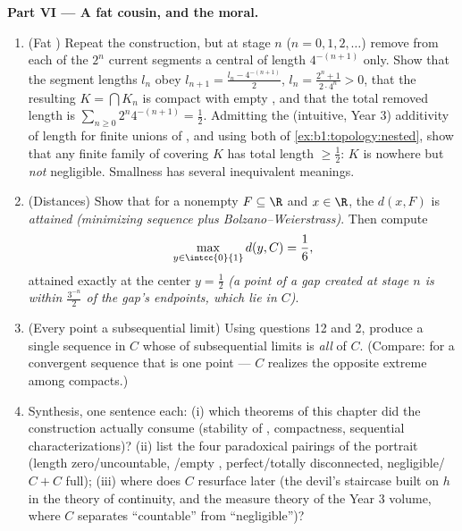 \begin{problem}[{Weekend problem --- the Cantor middle-thirds
\omterm{def:b1:logic:sets}{set}: length zero, uncountable, perfect, and $C + C =
\intcc{0}{2}$}]
\medskip
\noindent\textbf{Part VI --- A fat cousin, and the moral.}
\begin{enumerate}[resume]
  \item (Fat ) Repeat the construction, but at stage
        $n$ ($n = 0, 1, 2, \dots$) remove from each of the $2^n$
        current segments a central   of length
        $4^{-(n+1)}$ only. Show that the segment lengths $l_n$
        obey $l_{n+1} = \frac{l_n - 4^{-(n+1)}}{2}$, $l_n =
        \frac{2^n + 1}{2\cdot 4^n} > 0$, that the resulting
        $K = \bigcap K_n$ is compact with empty , and
        that the total removed length is $\sum_{n\geq0} 2^n
        4^{-(n+1)} = \frac12$. Admitting the (intuitive, Year 3)
        additivity of length for finite unions of , and
        using both  of \cref{ex:b1:topology:nested},
        show that any finite family of   covering
        $K$ has total length $\geq \frac12$: $K$ is nowhere
         but \emph{not} negligible. Smallness has several
        inequivalent meanings.
  \item (Distances) Show that for a nonempty  $F \subseteq
        \R$ and $x \in \R$, the  $d(x, F)$ is
        \emph{attained} \emph{(minimizing sequence plus
        Bolzano--Weierstrass)}. Then compute
        \[
        \max_{y \in \intcc{0}{1}} d(y, C) = \frac16 ,
        \]
        attained exactly at the center $y = \frac12$ \emph{(a
        point of a gap created at stage $n$ is within
        $\frac{3^{-n}}{2}$ of the gap's endpoints, which lie in
        $C$)}.
  \item (Every point a subsequential limit) Using questions 12
        and 2, produce a single sequence in $C$ whose  of
        subsequential limits is \emph{all} of $C$. (Compare:
        for a convergent sequence that  is one point ---
        $C$ realizes the opposite extreme among compacts.)
  \item Synthesis, one sentence each: (i) which theorems of this
        chapter did the construction actually consume (stability
        of , compactness, sequential
        characterizations)? (ii) list the four paradoxical
        pairings of the portrait (length zero/uncountable,
        /empty , perfect/totally disconnected,
        negligible/$C+C$ full); (iii) where does $C$ resurface
        later (the devil's staircase built on $h$ in the theory
        of continuity, and the measure theory of the Year 3
        volume, where $C$ separates ``countable'' from
        ``negligible'')?
\end{enumerate}
\end{problem}
